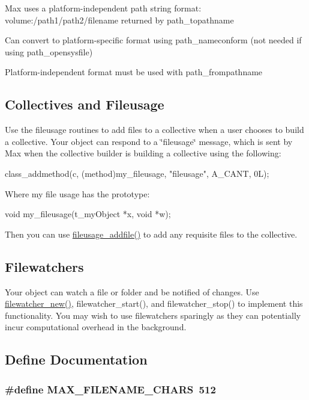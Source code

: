 \begin{DoxyItemize}
\item Max uses a platform-\/independent path string format: volume:/path1/path2/filename returned by path\_\-topathname
\item Can convert to platform-\/specific format using path\_\-nameconform (not needed if using path\_\-opensysfile)
\item Platform-\/independent format must be used with path\_\-frompathname
\end{DoxyItemize}\hypertarget{group__files_fileusage}{}\subsection{Collectives and Fileusage}\label{group__files_fileusage}
Use the fileusage routines to add files to a collective when a user chooses to build a collective. Your object can respond to a \char`\"{}fileusage\char`\"{} message, which is sent by Max when the collective builder is building a collective using the following: 
\begin{DoxyCode}
    class_addmethod(c, (method)my_fileusage,    "fileusage", A_CANT, 0L);
\end{DoxyCode}
 Where my file usage has the prototype: 
\begin{DoxyCode}
    void my_fileusage(t_myObject *x, void *w);
\end{DoxyCode}


Then you can use \hyperlink{group__files_ga30ae954756330e63f7b70fd5d312a90b}{fileusage\_\-addfile()} to add any requisite files to the collective.\hypertarget{group__files_filewatchers}{}\subsection{Filewatchers}\label{group__files_filewatchers}
Your object can watch a file or folder and be notified of changes. Use \hyperlink{group__files_gab81ffeda175d0b35f112d8f21ba6e819}{filewatcher\_\-new()}, filewatcher\_\-start(), and filewatcher\_\-stop() to implement this functionality. You may wish to use filewatchers sparingly as they can potentially incur computational overhead in the background. 

\subsection{Define Documentation}
\hypertarget{group__files_ga481556de2ccf516a499525edebc45ee8}{
\subsubsection[{MAX\_\-FILENAME\_\-CHARS}]{\setlength{\rightskip}{0pt plus 5cm}\#define MAX\_\-FILENAME\_\-CHARS~512}}
\label{group__files_ga481556de2ccf516a499525edebc45ee8}


